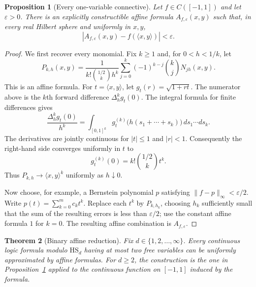 \documentclass[11pt]{article}
\newtheorem{theorem}{Theorem}
\newtheorem{proposition}[theorem]{Proposition}
\newcommand{\ip}[2]{\langle #1,#2\rangle}
\newcommand{\HS}{\mathrm{HS}}
\begin{document}
\begin{proposition}[Every one-variable connective]\label{prop:continuous}
Let $f\in C([-1,1])$ and let $\varepsilon>0$.  There is an explicitly
constructible affine formula $A_{f,\varepsilon}(x,y)$ such that, in every
real Hilbert sphere and uniformly in $x,y$,
\[
 \left|A_{f,\varepsilon}(x,y)-f(\ip{x}{y})\right|<\varepsilon.
\]
\end{proposition}

\begin{proof}
We first recover every monomial.  Fix $k\geq1$ and, for
$0<h<1/k$, let
\[
 P_{k,h}(x,y)=
 \frac{1}{k!\binom{1/2}{k}h^k}
 \sum_{j=0}^k(-1)^{k-j}\binom{k}{j}N_{jh}(x,y).
\]
This is an affine formula.  For $t=\ip{x}{y}$, let
$g_t(r)=\sqrt{1+rt}$.  The numerator above is the $k$th forward difference
$\Delta_h^kg_t(0)$.  The integral formula for finite differences gives
\[
 \frac{\Delta_h^kg_t(0)}{h^k}
 =\int_{[0,1]^k}g_t^{(k)}\bigl(h(s_1+\cdots+s_k)\bigr)
 \,ds_1\cdots ds_k.
\]
The derivatives are jointly continuous for $|t|\leq1$ and $|r|<1$.
Consequently the right-hand side converges uniformly in $t$ to
\[
 g_t^{(k)}(0)=k!\binom{1/2}{k}t^k.
\]
Thus $P_{k,h}\to\ip{x}{y}^k$ uniformly as $h\downarrow0$.

Now choose, for example, a Bernstein polynomial $p$ satisfying
$\|f-p\|_\infty<\varepsilon/2$.  Write $p(t)=\sum_{k=0}^m c_kt^k$.
Replace each $t^k$ by $P_{k,h_k}$, choosing $h_k$ sufficiently small that
the sum of the resulting errors is less than $\varepsilon/2$; use the
constant affine formula $1$ for $k=0$.  The resulting affine combination is
$A_{f,\varepsilon}$.
\end{proof}

\begin{theorem}[Binary affine reduction]\label{thm:binary}
Fix $d\in\{1,2,\ldots,\infty\}$.  Every continuous logic formula modulo
$\HS_d$ having at most two free variables can be uniformly approximated by
affine formulas.  For $d\geq2$, the construction is the one in
Proposition~\ref{prop:continuous} applied to the continuous function on
$[-1,1]$ induced by the formula.
\end{theorem}
\end{document}
